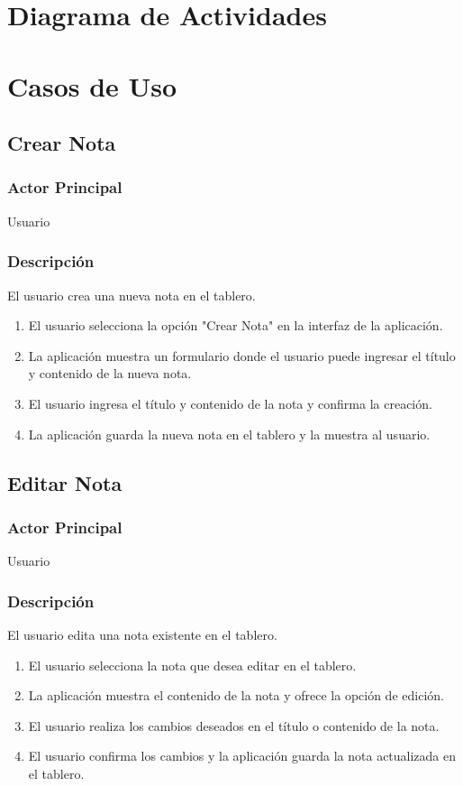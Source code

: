 \section{Diagrama de Actividades}


\section{Casos de Uso}
\subsection{Crear Nota}
\subsubsection{Actor Principal}
Usuario

\subsubsection{Descripción}
El usuario crea una nueva nota en el tablero.

\begin{enumerate}
  \item El usuario selecciona la opción "Crear Nota" en la interfaz de la aplicación.
  \item La aplicación muestra un formulario donde el usuario puede ingresar el título y contenido de la nueva nota.
  \item El usuario ingresa el título y contenido de la nota y confirma la creación.
  \item La aplicación guarda la nueva nota en el tablero y la muestra al usuario.
\end{enumerate}

\subsection{Editar Nota}
\subsubsection{Actor Principal}
Usuario

\subsubsection{Descripción}
El usuario edita una nota existente en el tablero.

\begin{enumerate}
  \item El usuario selecciona la nota que desea editar en el tablero.
  \item La aplicación muestra el contenido de la nota y ofrece la opción de edición.
  \item El usuario realiza los cambios deseados en el título o contenido de la nota.
  \item El usuario confirma los cambios y la aplicación guarda la nota actualizada en el tablero.
\end{enumerate}

